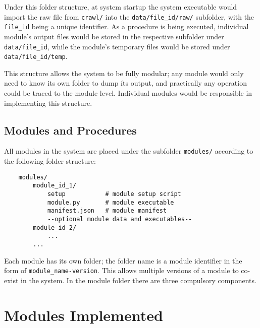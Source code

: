 Under this folder structure, at system startup the system executable would import the raw file from \verb|crawl/| into the \verb|data/file_id/raw/| subfolder, with the \verb|file_id| being a unique identifier. As a procedure is being executed, individual module's output files would be stored in the respective subfolder under \verb|data/file_id|, while the module's temporary files would be stored under \verb|data/file_id/temp|.

This structure allows the system to be fully modular; any module would only need to know its own folder to dump íts output, and practically any operation could be traced to the module level. Individual modules would be responsible in implementing this structure.

\subsection{Modules and Procedures}

All modules in the system are placed under the subfolder \verb|modules/| according to the following folder structure:

\begin{lstlisting}
    modules/
        module_id_1/
            setup           # module setup script
            module.py       # module executable
            manifest.json   # module manifest
            --optional module data and executables--
        module_id_2/
            ...
        ...            
\end{lstlisting}

Each module has its own folder; the folder name is a module identifier in the form of \verb|module_name-version|. This allows multiple versions of a module to co-exist in the system. In the module folder there are three compulsory components.

\section{Modules Implemented}